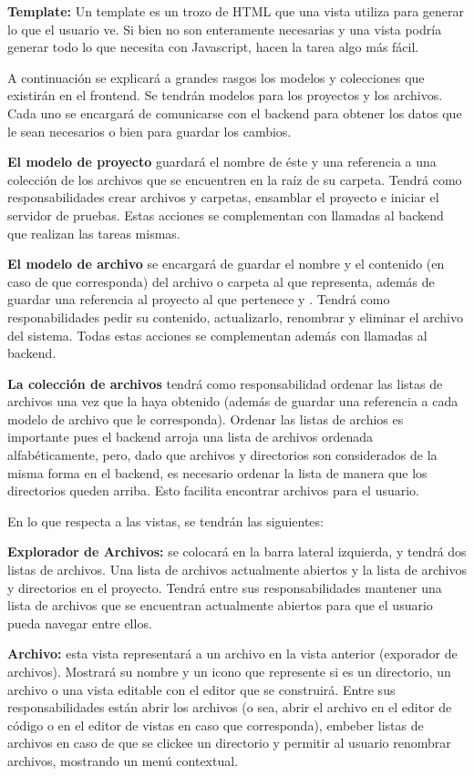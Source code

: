 \documentclass[12pt,titlepage,]{article}
\begin{document}
\textbf{Template:} Un template es un trozo de HTML que una vista utiliza
para generar lo que el usuario ve. Si bien no son enteramente necesarias
y una vista podría generar todo lo que necesita con Javascript, hacen la
tarea algo más fácil.

A continuación se explicará a grandes rasgos los modelos y colecciones
que existirán en el frontend. Se tendrán modelos para los proyectos y
los archivos. Cada uno se encargará de comunicarse con el backend para
obtener los datos que le sean necesarios o bien para guardar los
cambios.

\textbf{El modelo de proyecto} guardará el nombre de éste y una
referencia a una colección de los archivos que se encuentren en la raíz
de su carpeta. Tendrá como responsabilidades crear archivos y carpetas,
ensamblar el proyecto e iniciar el servidor de pruebas. Estas acciones
se complementan con llamadas al backend que realizan las tareas mismas.

\textbf{El modelo de archivo} se encargará de guardar el nombre y el
contenido (en caso de que corresponda) del archivo o carpeta al que
representa, además de guardar una referencia al proyecto al que
pertenece y . Tendrá como responabilidades pedir su contenido,
actualizarlo, renombrar y eliminar el archivo del sistema. Todas estas
acciones se complementan además con llamadas al backend.

\textbf{La colección de archivos} tendrá como responsabilidad ordenar
las listas de archivos una vez que la haya obtenido (además de guardar
una referencia a cada modelo de archivo que le corresponda). Ordenar las
listas de archios es importante pues el backend arroja una lista de
archivos ordenada alfabéticamente, pero, dado que archivos y directorios
son considerados de la misma forma en el backend, es necesario ordenar
la lista de manera que los directorios queden arriba. Esto facilita
encontrar archivos para el usuario.

En lo que respecta a las vistas, se tendrán las siguientes:

\textbf{Explorador de Archivos:} se colocará en la barra lateral
izquierda, y tendrá dos listas de archivos. Una lista de archivos
actualmente abiertos y la lista de archivos y directorios en el
proyecto. Tendrá entre sus responsabilidades mantener una lista de
archivos que se encuentran actualmente abiertos para que el usuario
pueda navegar entre ellos.

\textbf{Archivo:} esta vista representará a un archivo en la vista
anterior (exporador de archivos). Mostrará su nombre y un icono que
represente si es un directorio, un archivo o una vista editable con el
editor que se construirá. Entre sus responsabilidades están abrir los
archivos (o sea, abrir el archivo en el editor de código o en el editor
de vistas en caso que corresponda), embeber listas de archivos en caso
de que se clickee un directorio y permitir al usuario renombrar
archivos, mostrando un menú contextual.
\end{document}
